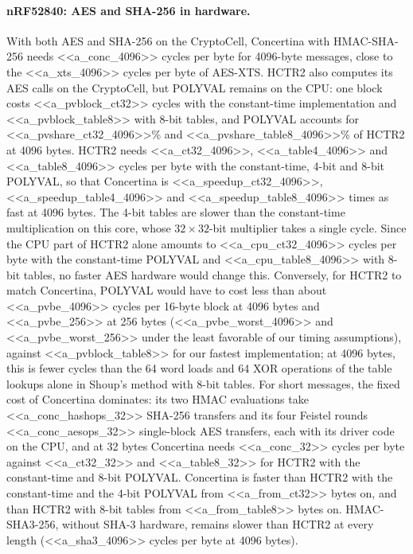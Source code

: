 \paragraph{nRF52840: AES and SHA-256 in hardware.}
With both AES and SHA-256 on the CryptoCell, Concertina with HMAC-SHA-256
needs <<a_conc_4096>> cycles per byte for 4096-byte messages, close to the
<<a_xts_4096>> cycles per byte of AES-XTS. HCTR2 also computes its AES calls
on the CryptoCell, but POLYVAL remains on the CPU: one block costs
<<a_pvblock_ct32>> cycles with the constant-time implementation and
<<a_pvblock_table8>> with 8-bit tables, and POLYVAL accounts for
<<a_pvshare_ct32_4096>>\% and <<a_pvshare_table8_4096>>\% of HCTR2 at 4096
bytes. HCTR2 needs <<a_ct32_4096>>, <<a_table4_4096>> and <<a_table8_4096>>
cycles per byte with the constant-time, 4-bit and 8-bit POLYVAL, so that
Concertina is <<a_speedup_ct32_4096>>, <<a_speedup_table4_4096>> and
<<a_speedup_table8_4096>> times as fast at 4096 bytes. The 4-bit tables are
slower than the constant-time multiplication on this core, whose
$32 \times 32$-bit multiplier takes a single cycle. Since the CPU
part of HCTR2 alone amounts to <<a_cpu_ct32_4096>> cycles per byte with the
constant-time POLYVAL and <<a_cpu_table8_4096>> with 8-bit tables, no faster
AES hardware would change this. Conversely, for HCTR2 to match
Concertina, POLYVAL would have to cost less than about <<a_pvbe_4096>>
cycles per 16-byte block at 4096 bytes and <<a_pvbe_256>> at 256 bytes
(<<a_pvbe_worst_4096>> and <<a_pvbe_worst_256>> under the least favorable of
our timing assumptions), against <<a_pvblock_table8>> for our fastest
implementation; at 4096 bytes, this is fewer cycles than the 64 word loads
and 64 XOR operations of the table lookups alone in Shoup's method with 8-bit
tables. For short messages, the fixed cost of
Concertina dominates: its two HMAC evaluations take <<a_conc_hashops_32>>
SHA-256 transfers and its four Feistel rounds <<a_conc_aesops_32>>
single-block AES transfers, each with its driver code on the CPU, and at 32
bytes Concertina needs <<a_conc_32>> cycles per byte against <<a_ct32_32>>
and <<a_table8_32>> for HCTR2 with the constant-time and 8-bit POLYVAL.
Concertina is faster than HCTR2 with the constant-time and the 4-bit POLYVAL
from <<a_from_ct32>> bytes on, and than HCTR2 with 8-bit tables from
<<a_from_table8>> bytes on.
HMAC-SHA3-256, without SHA-3 hardware, remains slower than HCTR2 at every
length (<<a_sha3_4096>> cycles per byte at 4096 bytes).


